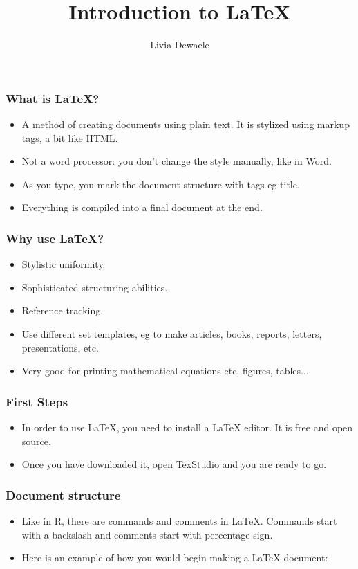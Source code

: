 \documentclass{beamer}
\title{Introduction to LaTeX}
\author{Livia Dewaele}
\begin{document}
\begin{frame}
\titlepage
\end{frame}

\begin{frame}
\frametitle{What is LaTeX?}
\begin{itemize}
	\setlength\itemsep{1em}
	\item A method of creating documents using plain text. It is stylized using markup tags, a bit like HTML. \\
	\item Not a word processor: you don't change the style manually, like in Word. \\
	\item As you type, you mark the document structure with tags eg title. \\
	\item Everything is compiled into a final document at the end.
\end{itemize}
\end{frame}

\begin{frame}
\frametitle{Why use LaTeX?}
\begin{itemize}
	\setlength\itemsep{1em}
	\item Stylistic uniformity.
	\item Sophisticated structuring abilities.
	\item Reference tracking.
	\item Use different set templates, eg to make articles, books, reports, letters, presentations, etc.
	\item Very good for printing mathematical equations etc, figures, tables...
\end{itemize}
\end{frame}

\begin{frame}
\frametitle{First Steps}
\begin{itemize}
	\setlength\itemsep{1em}
	\item In order to use LaTeX, you need to install a LaTeX editor. It is free and open source. 
	\item Once you have downloaded it, open TexStudio and you are ready to go.
\end{itemize}
\end{frame}


\begin{frame}
\frametitle{Document structure}
\begin{itemize}
	\setlength\itemsep{1em}
	\item	Like in R, there are commands and comments in LaTeX. Commands start with a backslash and comments start with percentage sign. 
	\item Here is an example of how you would begin making a LaTeX document:
\end{itemize}
\end{frame}
\end{document}
